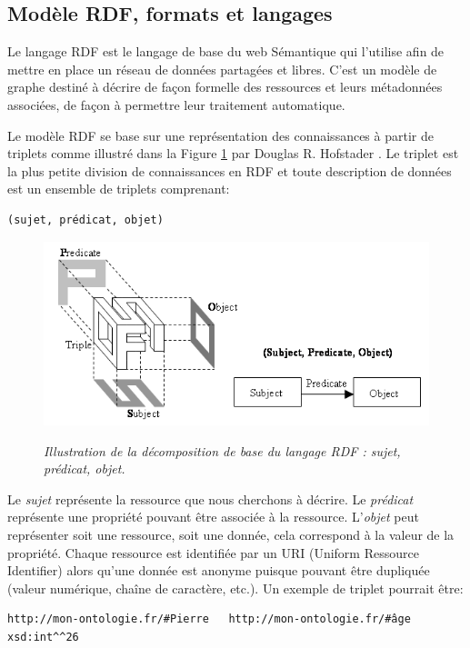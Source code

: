 \subsection{Modèle RDF, formats et langages} \label{rdf_model}

Le langage RDF est le langage de base du web Sémantique qui l'utilise afin de mettre en place un réseau de données partagées et libres. C'est un modèle de graphe destiné à décrire de façon formelle des ressources et leurs métadonnées associées, de façon à permettre leur traitement automatique.

Le modèle RDF se base sur une représentation des connaissances à partir de triplets comme illustré dans la Figure \ref{Fig:rdf_hofstader} par Douglas R. Hofstader \cite{douglas1979godel}. Le triplet est la plus petite division de connaissances en RDF et toute description de données est un ensemble de triplets comprenant:

\begin{lstlisting}
(sujet, prédicat, objet)
\end{lstlisting}

\begin{figure}
  \centering
  {\includegraphics[width=.5\linewidth]{./figures/ch2/rdf_hofstader.png}}
    \caption{\it Illustration de la décomposition de base du langage RDF : sujet, prédicat, objet.}
  \label{Fig:rdf_hofstader}
  \hspace{0.3cm}
\end{figure}

Le \textit{sujet} représente la ressource que nous cherchons à décrire. Le \textit{prédicat} représente une propriété pouvant être associée à la ressource. L'\textit{objet} peut représenter soit une ressource, soit une donnée, cela correspond à la valeur de la propriété.
Chaque ressource est identifiée par un URI (Uniform Ressource Identifier) alors qu'une donnée est anonyme puisque pouvant être dupliquée (valeur numérique, chaîne de caractère, etc.). Un exemple de triplet pourrait être:

\begin{lstlisting}
http://mon-ontologie.fr/#Pierre   http://mon-ontologie.fr/#âge  xsd:int^^26
\end{lstlisting}

